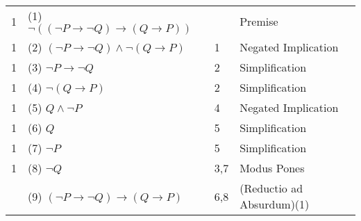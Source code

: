 \documentclass{article}
\theoremstyle{definition}
\begin{document}
\begin{tabular}{llll}
1 & (1) $ \neg (( \neg P \to  \neg Q) \to (Q \to P))$ &  & Premise\\
1 & (2) $( \neg P \to  \neg Q) \wedge  \neg (Q \to P)$ & 1 & Negated Implication\\
1 & (3) $ \neg P \to  \neg Q$ & 2 & Simplification\\
1 & (4) $ \neg (Q \to P)$ & 2 & Simplification\\
1 & (5) $Q \wedge  \neg P$ & 4 & Negated Implication\\
1 & (6) $Q$ & 5 & Simplification\\
1 & (7) $ \neg P$ & 5 & Simplification\\
1 & (8) $ \neg Q$ & 3,7 & Modus Pones\\
 & (9) $( \neg P \to  \neg Q) \to (Q \to P)$ & 6,8 & (Reductio ad Absurdum)(1)\\
\end{tabular}

\bigskip
\bigskip
\end{document}
